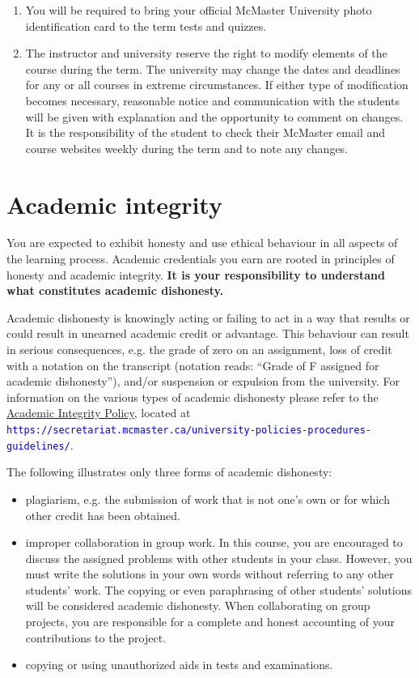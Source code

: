 \documentclass[12pt]{article}
\newcommand{\url}[1]{{\tt\textcolor{blue}{#1}}}
\begin{document}
\begin{enumerate}
\item You will be required to bring your official McMaster University photo identification card to the term tests and quizzes.

\item The instructor and university reserve the right to modify elements of the course during the term.  The university may change the dates and deadlines for any or all courses in extreme circumstances.  If either type of modification becomes necessary, reasonable notice and communication with the students will be given with explanation and the opportunity to comment on changes.  It is the responsibility of the student to check their McMaster email and course websites weekly during the term and to note any changes.

\end{enumerate}

\section*{Academic integrity}

You are expected to exhibit honesty and use ethical behaviour in all
aspects of the learning process. Academic credentials you earn are
rooted in principles of honesty and academic integrity. \textbf{It is
your responsibility to understand what constitutes academic dishonesty.}

Academic dishonesty is knowingly acting or failing to act in a way that results or could result in unearned academic credit or advantage. This behaviour can result in serious consequences, e.g. the grade of zero on an assignment, loss of credit with a notation on the transcript (notation reads: ``Grade of F assigned for academic dishonesty''), and/or suspension or expulsion from the university. For information on the various types of academic dishonesty please refer to the \href{https://secretariat.mcmaster.ca/app/uploads/Academic-Integrity-Policy-1-1.pdf}{Academic Integrity Policy}, located at \url{https://secretariat.mcmaster.ca/university-policies-procedures-guidelines/}.

The following illustrates only three forms of academic dishonesty:

\begin{itemize}
\item
  plagiarism, e.g. the submission of work that is not one's own or for
  which other credit has been obtained.
\item
  improper collaboration in group work. In this course, you are encouraged to discuss the assigned problems with other students in your class. However, you must write the solutions in your own words without referring to any other students' work. The copying or even paraphrasing of other students' solutions will be considered academic dishonesty. When collaborating on group projects, you are responsible for a complete and honest accounting of your contributions to the project.
\item
  copying or using unauthorized aids in tests and examinations.
\end{itemize}
\end{document}
